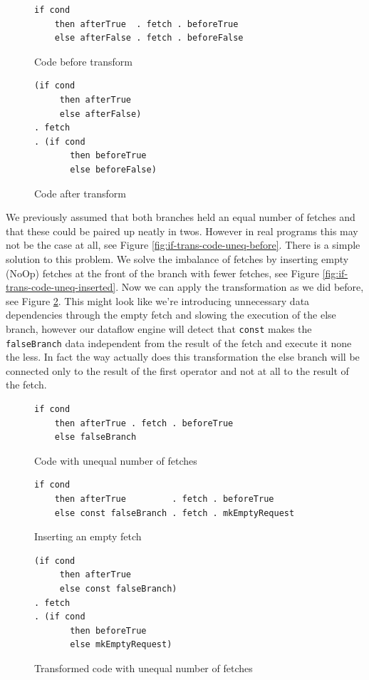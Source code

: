 \begin{figure}
\begin{verbatim}
if cond 
    then afterTrue  . fetch . beforeTrue 
    else afterFalse . fetch . beforeFalse
\end{verbatim}
\caption{Code before transform}
\label{fig:if-trans-code-before}
\begin{verbatim}
(if cond 
     then afterTrue 
     else afterFalse) 
. fetch 
. (if cond 
       then beforeTrue 
       else beforeFalse)
\end{verbatim}
\caption{Code after transform}
\label{fig:if-trans-code-after}
\end{figure}

We previously assumed that both branches held an equal number of fetches and that these could be paired up neatly in twos.
However in real programs this may not be the case at all, see Figure \ref{fig:if-trans-code-uneq-before}.
There is a simple solution to this problem.
We solve the imbalance of fetches by inserting empty (NoOp) fetches at the front of the branch with fewer fetches, see Figure \ref{fig:if-trans-code-uneq-inserted}.
Now we can apply the transformation as we did before, see Figure \ref{fig:if-trans-code-uneq-after}.
This might look like we're introducing unnecessary data dependencies through the empty fetch and slowing the execution of the else branch, however our dataflow engine will detect that \texttt{const} makes the \texttt{falseBranch} data independent from the result of the fetch and execute it none the less.
In fact the way \yauhau{} actually does this transformation the else branch will be connected only to the result of the first \opite{} operator and not at all to the result of the fetch.

\begin{figure}
\begin{verbatim}
if cond 
    then afterTrue . fetch . beforeTrue 
    else falseBranch	
\end{verbatim}
\caption{Code with unequal number of fetches}
\label{fig:if-trans-code-uneq-before}
\begin{verbatim}
if cond 
    then afterTrue         . fetch . beforeTrue 
    else const falseBranch . fetch . mkEmptyRequest
\end{verbatim}
\caption{Inserting an empty fetch}
\label{fig:if-trans-code-uneq-inserted}
\begin{verbatim}
(if cond 
     then afterTrue 
     else const falseBranch) 
. fetch 
. (if cond 
       then beforeTrue 
       else mkEmptyRequest)
\end{verbatim}
\caption{Transformed code with unequal number of fetches}
\label{fig:if-trans-code-uneq-after}
\end{figure}

